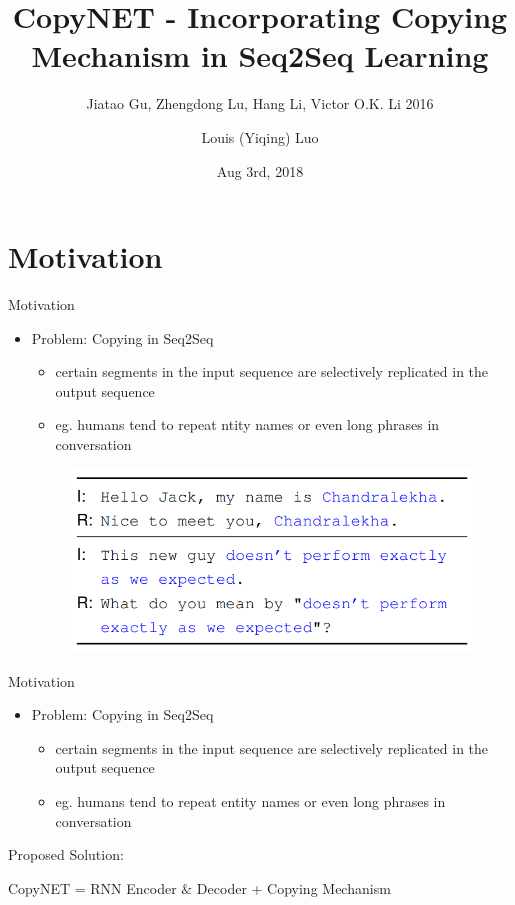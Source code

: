 \documentclass{beamer}
\title{CopyNET - Incorporating Copying Mechanism in Seq2Seq Learning}
\subtitle{Jiatao Gu, Zhengdong Lu, Hang Li, Victor O.K. Li 2016 }
\author{Louis (Yiqing) Luo}
\institute[University of Toronto] %
\date{Aug 3rd, 2018}
\begin{document}
\begin{frame}
  \titlepage
\end{frame}




\section{Motivation}
\begin{frame}{Motivation}
    \begin{itemize}
        \item Problem: Copying in Seq2Seq
        
        \begin{itemize}
            \item  certain segments in the input sequence are selectively replicated in the output sequence
            \item eg. humans tend to repeat ntity names or even long phrases in conversation
        \end{itemize}
        
        \begin{figure}
            \centering \includegraphics{eg.PNG}
        \end{figure}
    \end{itemize}
    
\end{frame}

\begin{frame}{Motivation}
\begin{itemize}
   \item Problem: Copying in Seq2Seq
        
        \begin{itemize}
            \item  certain segments in the input sequence are selectively replicated in the output sequence
            \item eg. humans tend to repeat entity names or even long phrases in conversation
        \end{itemize}
\end{itemize} 
Proposed Solution:     
\begin{center}
    CopyNET = RNN Encoder $\&$ Decoder + Copying Mechanism
\end{center}
    
\end{frame}
\end{document}
